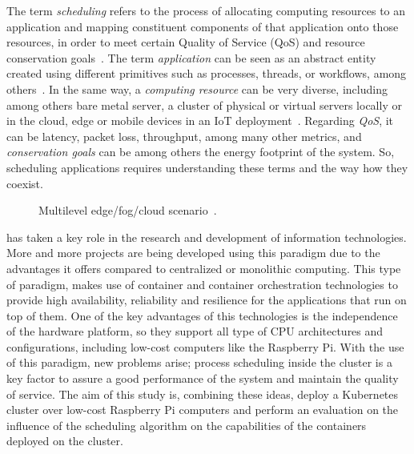 \documentclass[conference]{IEEEtran}
\begin{document}
The term \emph{scheduling} refers to the process of allocating computing resources to an application and mapping constituent components of that application onto those resources, in order to meet certain Quality of Service (QoS) and resource conservation goals~\cite{Pinedo08}. The term \emph{application} can be seen as an abstract entity created using different primitives such as processes, threads, or workflows, among others~\cite{Tucker89, Taylor07}. In the same way, a \emph{computing resource} can be very diverse, including among others bare metal server, a cluster of physical or virtual servers locally or in the cloud, edge or mobile devices in an IoT deployment~\cite{LiuYDA19, Zhan2015}. Regarding \emph{QoS}, it can be latency, packet loss, throughput, among many other metrics, and \emph{conservation goals} can be among others the energy footprint of the system. So, scheduling applications requires understanding these terms and the way how they coexist. 

\begin{figure}[t!]
\begin{center}
\strut{}
\caption{Multilevel edge/fog/cloud scenario~\cite{BittencourtMBRP17}.}\label{fig:edgefogcloud}
\end{center}
\end{figure}




has taken a key role in the research and development of information technologies. More and more projects are being developed using this paradigm due to the advantages it offers compared to centralized or monolithic computing.
This type of paradigm, makes use of container and container orchestration technologies to provide high availability, reliability and resilience
for the applications that run on top of them. One of the key advantages of this technologies is the independence of the hardware platform, so they
support all type of CPU architectures and configurations, including low-cost computers like the Raspberry Pi. With the use of this paradigm,
new problems arise; process scheduling inside the cluster is a key factor to assure a good performance of the system and maintain the quality
of service. The aim of this study is, combining these ideas, deploy a Kubernetes cluster over low-cost Raspberry Pi computers and perform an evaluation
on the influence of the scheduling algorithm on the capabilities of the containers deployed on the cluster.
\end{document}
